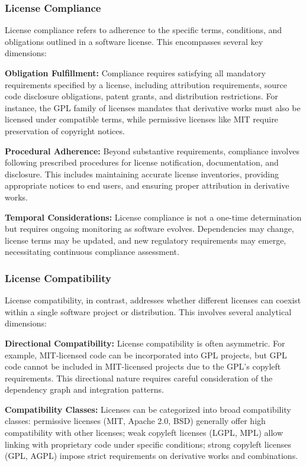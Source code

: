 \documentclass[9pt,twocolumn]{article}
\begin{document}
\subsubsection{License Compliance}
License compliance refers to adherence to the specific terms, conditions, and obligations outlined in a software license. This encompasses several key dimensions:

\textbf{Obligation Fulfillment:} Compliance requires satisfying all mandatory requirements specified by a license, including attribution requirements, source code disclosure obligations, patent grants, and distribution restrictions. For instance, the GPL family of licenses mandates that derivative works must also be licensed under compatible terms, while permissive licenses like MIT require preservation of copyright notices.

\textbf{Procedural Adherence:} Beyond substantive requirements, compliance involves following prescribed procedures for license notification, documentation, and disclosure. This includes maintaining accurate license inventories, providing appropriate notices to end users, and ensuring proper attribution in derivative works.

\textbf{Temporal Considerations:} License compliance is not a one-time determination but requires ongoing monitoring as software evolves. Dependencies may change, license terms may be updated, and new regulatory requirements may emerge, necessitating continuous compliance assessment.

\subsubsection{License Compatibility}
License compatibility, in contrast, addresses whether different licenses can coexist within a single software project or distribution. This involves several analytical dimensions:

\textbf{Directional Compatibility:} License compatibility is often asymmetric. For example, MIT-licensed code can be incorporated into GPL projects, but GPL code cannot be included in MIT-licensed projects due to the GPL's copyleft requirements. This directional nature requires careful consideration of the dependency graph and integration patterns.

\textbf{Compatibility Classes:} Licenses can be categorized into broad compatibility classes: permissive licenses (MIT, Apache 2.0, BSD) generally offer high compatibility with other licenses; weak copyleft licenses (LGPL, MPL) allow linking with proprietary code under specific conditions; strong copyleft licenses (GPL, AGPL) impose strict requirements on derivative works and combinations.
\end{document}
